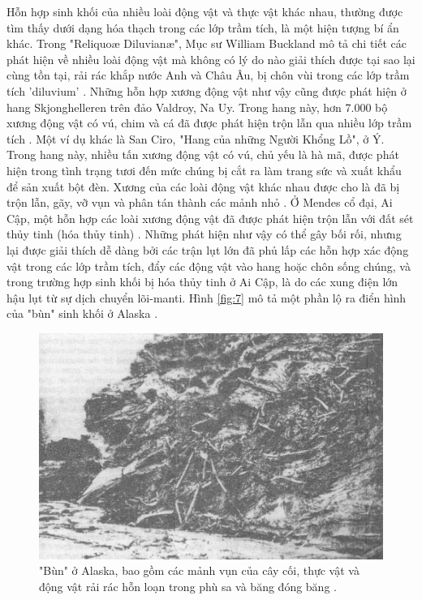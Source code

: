 \documentclass[10pt,twocolumn,letterpaper]{article}
\begin{document}
Hỗn hợp sinh khối của nhiều loài động vật và thực vật khác nhau, thường được tìm thấy dưới dạng hóa thạch trong các lớp trầm tích, là một hiện tượng bí ẩn khác. Trong "Reliquoæ Diluvianæ", Mục sư William Buckland mô tả chi tiết các phát hiện về nhiều loài động vật mà không có lý do nào giải thích được tại sao lại cùng tồn tại, rải rác khắp nước Anh và Châu Âu, bị chôn vùi trong các lớp trầm tích 'diluvium' \cite{58}. Những hỗn hợp xương động vật như vậy cũng được phát hiện ở hang Skjonghelleren trên đảo Valdroy, Na Uy. Trong hang này, hơn 7.000 bộ xương động vật có vú, chim và cá đã được phát hiện trộn lẫn qua nhiều lớp trầm tích \cite{59}. Một ví dụ khác là San Ciro, "Hang của những Người Khổng Lồ", ở Ý. Trong hang này, nhiều tấn xương động vật có vú, chủ yếu là hà mã, được phát hiện trong tình trạng tươi đến mức chúng bị cắt ra làm trang sức và xuất khẩu để sản xuất bột đèn. Xương của các loài động vật khác nhau được cho là đã bị trộn lẫn, gãy, vỡ vụn và phân tán thành các mảnh nhỏ \cite{60,61}. Ở Mendes cổ đại, Ai Cập, một hỗn hợp các loài xương động vật đã được phát hiện trộn lẫn với đất sét thủy tinh (hóa thủy tinh) \cite{57}. Những phát hiện như vậy có thể gây bối rối, nhưng lại được giải thích dễ dàng bởi các trận lụt lớn đã phủ lấp các hỗn hợp xác động vật trong các lớp trầm tích, đẩy các động vật vào hang hoặc chôn sống chúng, và trong trường hợp sinh khối bị hóa thủy tinh ở Ai Cập, là do các xung điện lớn hậu lụt từ sự dịch chuyển lõi-manti. Hình \ref{fig:7} mô tả một phần lộ ra điển hình của "bùn" sinh khối ở Alaska \cite{56}.

\begin{figure}[t]
\begin{center}
   \includegraphics[width=1\linewidth]{muck-crop.jpeg}
\end{center}
   \caption{"Bùn" ở Alaska, bao gồm các mảnh vụn của cây cối, thực vật và động vật rải rác hỗn loạn trong phù sa và băng đóng băng \cite{146}.}
\label{fig:7}
\label{fig:onecol}
\end{figure}
\end{document}
